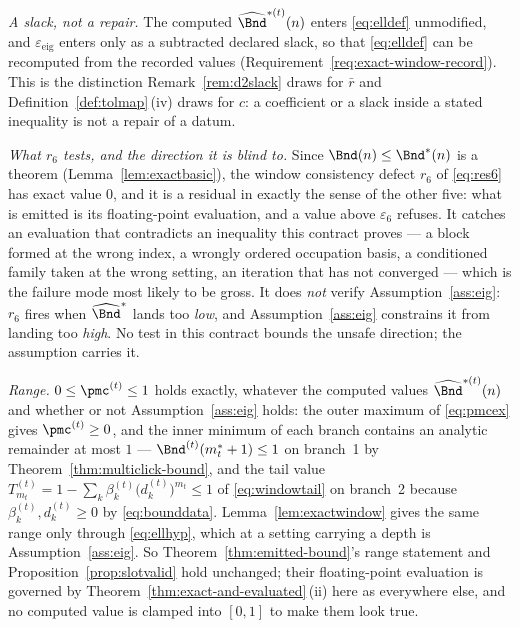 \begin{remark}
\emph{A slack, not a repair.} The computed $\widehat\Bnd^{\ast(t)}(n)$
enters \eqref{eq:elldef} unmodified, and $\varepsilon_{\mathrm{eig}}$ enters
only as a subtracted declared slack, so that \eqref{eq:elldef} can be
recomputed from the recorded values
(Requirement~\ref{req:exact-window-record}). This is the distinction
Remark~\ref{rem:d2slack} draws for $\bar r$ and
Definition~\ref{def:tolmap}\,(iv) draws for $c$: a coefficient or a slack
inside a stated inequality is not a repair of a datum.

\emph{What $r_6$ tests, and the direction it is blind to.} Since
$\Bnd(n)\le\Bnd^{\ast}(n)$ is a theorem (Lemma~\ref{lem:exactbasic}), the
window consistency defect $r_6$ of \eqref{eq:res6} has exact value $0$, and
it is a residual in exactly the sense of the other five: what is emitted is
its floating-point evaluation, and a value above $\varepsilon_6$ refuses. It
catches an evaluation that contradicts an inequality this contract proves
--- a block formed at the wrong index, a wrongly ordered occupation basis, a
conditioned family taken at the wrong setting, an iteration that has not
converged --- which is the failure mode most likely to be gross. It does
\emph{not} verify Assumption~\ref{ass:eig}: $r_6$ fires when
$\widehat\Bnd^{\ast}$ lands too \emph{low}, and Assumption~\ref{ass:eig}
constrains it from landing too \emph{high}. No test in this contract bounds
the unsafe direction; the assumption carries it.

\emph{Range.} $0\le\pmc^{(t)}\le1$ holds exactly, whatever the computed
values $\widehat\Bnd^{\ast(t)}(n)$ and whether or not
Assumption~\ref{ass:eig} holds: the outer maximum of \eqref{eq:pmcex} gives
$\pmc^{(t)}\ge0$, and the inner minimum of each branch contains an analytic
remainder at most $1$ --- $\Bnd^{(t)}(m^{\ast}_t+1)\le1$ on branch~1 by
Theorem~\ref{thm:multiclick-bound}, and the tail value
$T^{(t)}_{m_t}=1-\sum_k\beta^{(t)}_k\big(d^{(t)}_k\big)^{m_t}\le1$ of
\eqref{eq:windowtail} on branch~2 because $\beta^{(t)}_k,d^{(t)}_k\ge0$ by
\eqref{eq:bounddata}. Lemma~\ref{lem:exactwindow} gives the same range only
through \eqref{eq:ellhyp}, which at a setting carrying a depth is
Assumption~\ref{ass:eig}. So Theorem~\ref{thm:emitted-bound}'s range statement
and Proposition~\ref{prop:slotvalid} hold unchanged; their floating-point
evaluation is governed by Theorem~\ref{thm:exact-and-evaluated}\,(ii) here as everywhere
else, and no computed value is clamped into $[0,1]$ to make them look true.
\end{remark}
